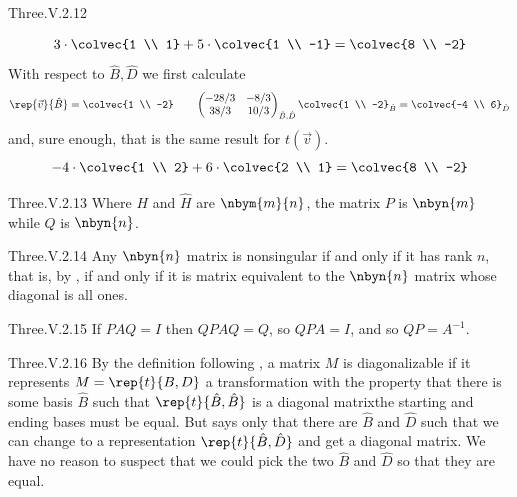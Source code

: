 \begin{ans}{Three.V.2.12}
\begin{exparts}
\begin{equation*}
        3\cdot\colvec{1 \\ 1}+5\cdot\colvec{1 \\ -1}=\colvec{8 \\ -2}
      \end{equation*}
      With respect to $\hat{B},\hat{D}$ we first calculate
      \begin{equation*}
        \rep{\vec{v}}{\hat{B}}=\colvec{1 \\ -2}
        \qquad
        \begin{pmatrix}
          -28/3  &-8/3  \\
          38/3   &10/3
        \end{pmatrix}_{\hat{B},\hat{D}}
        \colvec{1 \\ -2}_{\hat{B}}
        =\colvec{-4 \\ 6}_{\hat{D}}
      \end{equation*}
      and, sure enough, that is the same result for $t(\vec{v})$.
      \begin{equation*}
        -4\cdot\colvec{1 \\ 2}+6\cdot\colvec{2 \\ 1}=\colvec{8 \\ -2}
      \end{equation*}
      \end{exparts}
    
\end{ans}
\begin{ans}{Three.V.2.13}
      Where \( H \) and \( \hat{H} \) are \( \nbym{m}{n} \), the
      matrix \( P \) is \( \nbyn{m} \) while \( Q \) is \( \nbyn{n} \).
    
\end{ans}
\begin{ans}{Three.V.2.14}
        Any \( \nbyn{n} \) matrix is nonsingular if and only if it has
        rank \( n \), that is, by  ,
        if and only if it is matrix equivalent to
        the $\nbyn{n}$ matrix whose diagonal is all ones.
    
\end{ans}
\begin{ans}{Three.V.2.15}
      If \( PAQ=I \) then \( QPAQ=Q \), so \( QPA=I \), and so
      \( QP=A^{-1} \).
    
\end{ans}
\begin{ans}{Three.V.2.16}
      By the definition following  , a matrix
      $M$ is diagonalizable if it represents $M=\rep{t}{B,D}$
      a transformation with the property that there is some basis
      $\hat{B}$ such that $\rep{t}{\hat{B},\hat{B}}$ is a diagonal
      matrix\Dash the starting and ending bases must be equal.
      But   says only that there are
      $\hat{B}$ and $\hat{D}$ such that we can
      change to a representation $\rep{t}{\hat{B},\hat{D}}$ and get a diagonal
      matrix.
      We have no reason to suspect that we could pick the two
      $\hat{B}$ and $\hat{D}$ so that they are equal.
    
\end{ans}
